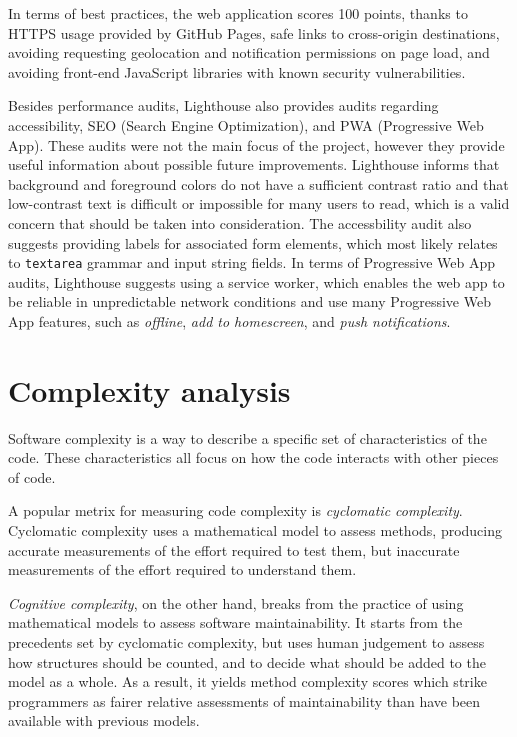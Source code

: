 \documentclass[english,engineering]{wizthesis}
\begin{document}
In terms of best practices, the web application scores 100 points, thanks to
HTTPS usage provided by GitHub Pages, safe links to cross-origin destinations,
avoiding requesting geolocation and notification permissions on page load,
and avoiding front-end JavaScript libraries with known security vulnerabilities.

Besides performance audits, Lighthouse also provides audits regarding
accessibility, SEO (Search Engine Optimization), and PWA (Progressive Web App).
These audits were not the main focus of the project, however they provide useful
information about possible future improvements. Lighthouse informs that
background and foreground colors do not have a sufficient contrast ratio and
that low-contrast text is difficult or impossible for many users to read, which
is a valid concern that should be taken into consideration. The accessbility
audit also suggests providing labels for associated form elements, which most
likely relates to \texttt{textarea} grammar and input string fields. In terms of
Progressive Web App audits, Lighthouse suggests using a service worker, which
enables the web app to be reliable in unpredictable network conditions and use
many Progressive Web App features, such as \emph{offline}, \emph{add to
homescreen}, and \emph{push notifications}.

\newpage

\section{Complexity analysis}

Software complexity is a way to describe a specific set of characteristics of
the code. These characteristics all focus on how the code interacts with other
pieces of code.

A popular metrix for measuring code complexity is \emph{cyclomatic complexity}.
Cyclomatic complexity uses a mathematical model to assess methods, producing
accurate measurements of the effort required to test them, but inaccurate
measurements of the effort required to understand them.

\emph{Cognitive complexity}, on the other hand, breaks from the practice of
using mathematical models to assess software maintainability. It starts from the
precedents set by cyclomatic complexity, but uses human judgement to assess how
structures should be counted, and to decide what should be added to the model as
a whole. As a result, it yields method complexity scores which strike
programmers as fairer relative assessments of maintainability than have been
available with previous models.
\end{document}

